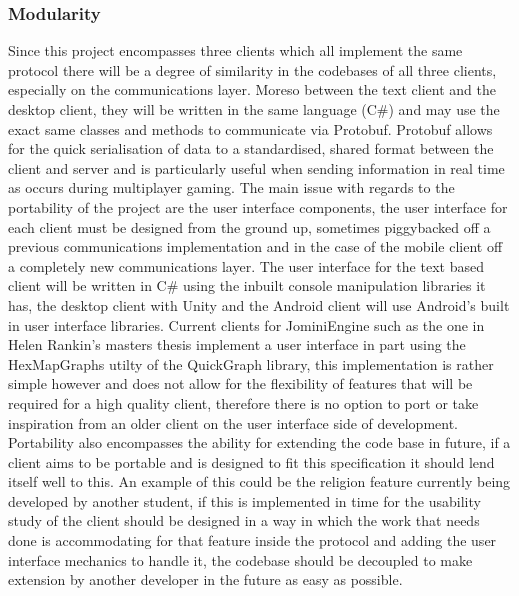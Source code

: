 \documentclass{article}
\begin{document}
    \subsubsection{Modularity}
    Since this project encompasses three clients which all implement the same protocol there will be a degree of similarity in the codebases of all three clients, especially on the communications layer. Moreso between the text client and the desktop client, they will be written in the same language (C\#) and may use the exact same classes and methods to communicate via Protobuf\cite{Protobuf}. Protobuf allows for the quick serialisation of data to a standardised, shared format between the client and server and is particularly useful when sending information in real time as occurs during multiplayer gaming. The main issue with regards to the portability of the project are the user interface components, the user interface for each client must be designed from the ground up, sometimes piggybacked off a previous communications implementation and in the case of the mobile client off a completely new communications layer. The user interface for the text based client will be written in C\# using the inbuilt console manipulation libraries it has\cite{ConsoleClass}, the desktop client with Unity\cite{Unity3D} and the Android client will use Android's built in user interface libraries\cite{AndroidUI}. Current clients for JominiEngine such as the one in Helen Rankin's masters thesis\cite{helenrankin} implement a user interface in part using the HexMapGraphs utilty of the QuickGraph library\cite{QuickGraph}, this implementation is rather simple however and does not allow for the flexibility of features that will be required for a high quality client, therefore there is no option to port or take inspiration from an older client on the user interface side of development. Portability also encompasses the ability for extending the code base in future, if a client aims to be portable and is designed to fit this specification it should lend itself well to this. An example of this could be the religion feature currently being developed by another student, if this is implemented in time for the usability study of the client should be designed in a way in which the work that needs done is accommodating for that feature inside the protocol and adding the user interface mechanics to handle it, the codebase should be decoupled to make extension by another developer in the future as easy as possible. 
    
\end{document}
